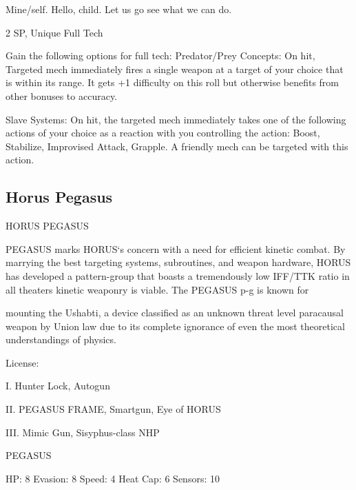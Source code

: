 Mine/self. Hello, child. Let us go see what we can do.   

2 SP, Unique  
Full Tech
 
Gain the following options for full tech:  
        Predator/Prey Concepts: On hit, Targeted mech immediately fires a single weapon at a  
        target of your choice that is within its range. It gets +1 difficulty on this roll but otherwise  
         benefits from other bonuses to accuracy.
 
        Slave Systems: On hit, the targeted mech immediately takes one of the following actions  
         of your choice as a reaction with you controlling the action: Boost, Stabilize, Improvised  
        Attack, Grapple. A friendly mech can be targeted with this action.
 

                                                                                                           
\subsection{Horus Pegasus}

                                         HORUS PEGASUS  

PEGASUS marks HORUS‘s concern with a need for efficient kinetic combat. By marrying the best targeting  
systems, subroutines, and weapon hardware, HORUS has developed a pattern-group that boasts a  
tremendously low IFF/TTK ratio in all theaters kinetic weaponry is viable. The PEGASUS p-g is known for  

mounting the Ushabti, a device classified as an unknown threat level paracausal weapon by Union law due  
to its complete ignorance of even the most theoretical understandings of physics.  

                                                  License:
 
I. Hunter Lock, Autogun
 
II. PEGASUS FRAME, Smartgun, Eye of HORUS
 
III. Mimic Gun, Sisyphus-class NHP
 

                                                                                                           


                                                    PEGASUS 

  HP: 8           Evasion: 8                              Speed: 4            Heat Cap: 6         Sensors: 10 


